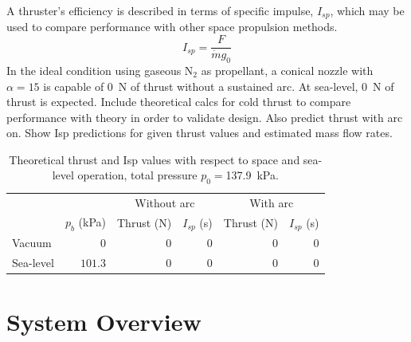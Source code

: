 \documentclass[journal]{IEEEtran}
\begin{document}
 A thruster's efficiency is described in terms of specific impulse, $I_{sp}$, which may be used to compare performance with other space propulsion methods.
 \begin{equation}
 \label{eq:isp}
   I_{sp}=\frac{F}{\dot{m} g_0}
 \end{equation}
In the ideal condition using gaseous N$_2$ as propellant, a conical nozzle with $\alpha=15$ is capable of \SI{0}{\newton} of thrust without a sustained arc.
At sea-level, \SI{0}{\newton} of thrust is expected.
{\color{red}Include theoretical calcs for cold thrust to compare performance with theory in order to validate design.
Also predict thrust with arc on.
Show Isp predictions for given thrust values and estimated mass flow rates.}

\begin{table}[hbp]
  \caption{Theoretical thrust and Isp values with respect to space and sea-level operation, total pressure $p_0= $\SI{137.9}{\kilo\pascal}.
\label{tab:theoretical-performance}
}
  \begin{tabular}{lrrrrr}
    \toprule
    & & \multicolumn{2}{c}{Without arc} & \multicolumn{2}{c}{With arc} \\
    & $p_b$ (\si{\kilo\pascal}) & Thrust (\si{\newton}) & $I_{sp}$ (\si{\second}) & Thrust (\si{\newton}) & $I_{sp}$ (\si{\second}) \\
    \midrule
    Vacuum & $0$ & $0$ & $0$ & $0$ & $0$ \\
    Sea-level & $101.3$ & $0$ & $0$ & $0$ & $0$  \\
    \bottomrule
  \end{tabular}
\end{table}

\section{System Overview}
\end{document}
